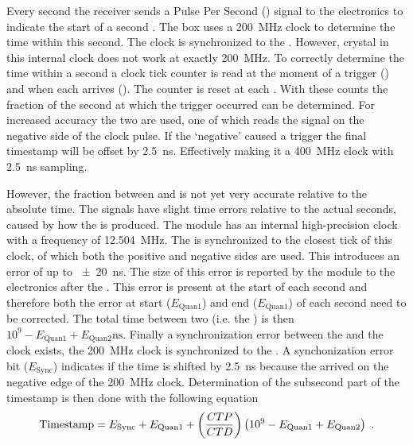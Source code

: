 Every second the \gps receiver sends a Pulse Per Second (\pps) signal to the \hisparc electronics to indicate the start of a second \cite{verkooijen2008firmware}. The \hisparc box uses a \SI{200}{\mega\hertz} clock to determine the time within this second. The clock is synchronized to the \pps. However, crystal in this internal clock does not work at exactly \SI{200}{\mega\hertz}. To correctly determine the time within a second a clock tick counter is read at the moment of a trigger (\ctd) and when each \pps arrives (\ctp). The counter is reset at each \pps. With these counts the fraction of the second at which the trigger occurred can be determined. For increased accuracy the two \adcs are used, one of which reads the signal on the negative side of the clock pulse. If the `negative' \adc caused a trigger the final timestamp will be offset by \SI{2.5}{\ns}. Effectively making it a \SI{400}{\mega\hertz} clock with \SI{2.5}{\ns} sampling.

However, the fraction between \ctd and \ctp is not yet very accurate relative to the absolute \gps time. The \pps signals have slight time errors relative to the actual \gps seconds, caused by how the \pps is produced. The \gps module has an internal high-precision clock with a frequency of  \SI{12.504}{\mega\hertz}. The \pps is synchronized to the closest tick of this clock, of which both the positive and negative sides are used. This introduces an error of up to \SI{\pm 20}{\ns}. The size of this error is reported by the \gps module to the electronics after the \pps. This error is present at the start of each second and therefore both the error at start ($E_{\mathrm{Quan1}}$) and end ($E_{\mathrm{Quan1}}$) of each second need to be corrected. The total time between two \pps (i.e. the \ctp) is then $10^9 - E_{\mathrm{Quan1}} + E_{\mathrm{Quan2}} \si{\ns}$. Finally a synchronization error between the \pps and the \hisparc clock exists, the \SI{200}{\mega\hertz} clock is synchronized to the \pps. A synchonization error bit ($E_{\mathrm{Sync}}$) indicates if the time is shifted by \SI{2.5}{\ns} because the \pps arrived on the negative edge of the \SI{200}{\mega\hertz} clock.
Determination of the subsecond part of the timestamp is then done with the following equation
%
\begin{equation}
\label{eq:timestamp}
    \mathrm{Timestamp} =
        E_{\mathrm{Sync}} + E_{\mathrm{Quan1}} + \left(\frac{\ctd}{\ctp}\right)
        \left(10^9 - E_{\mathrm{Quan1}} + E_{\mathrm{Quan2}}\right) \ .
\end{equation}

